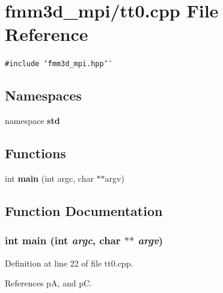 \section{fmm3d\_\-mpi/tt0.cpp File Reference}
\label{tt0_8cpp}


{\tt \#include \char`\"{}fmm3d\_\-mpi.hpp\char`\"{}}\par
\subsection*{Namespaces}
\begin{CompactItemize}
\item 
namespace {\bf std}
\end{CompactItemize}
\subsection*{Functions}
\begin{CompactItemize}
\item 
int {\bf main} (int argc, char $\ast$$\ast$argv)
\end{CompactItemize}


\subsection{Function Documentation}
\subsubsection{\setlength{\rightskip}{0pt plus 5cm}int main (int {\em argc}, char $\ast$$\ast$ {\em argv})}\label{tt0_8cpp_30c4c19ff69d905e8e4c750b3af23485_30c4c19ff69d905e8e4c750b3af23485}




Definition at line 22 of file tt0.cpp.

References p\-A, and p\-C.

